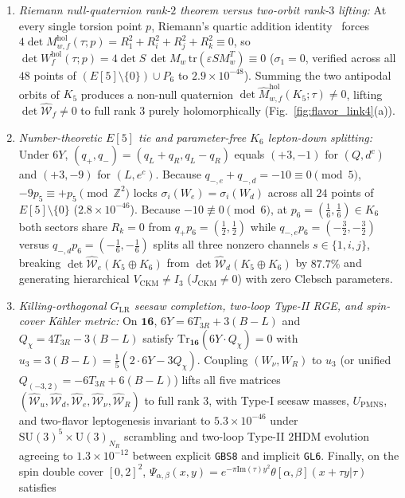 \documentclass[aps,prd,twocolumn,nofootinbib,floatfix]{revtex4-2}
\begin{document}
\begin{enumerate}
    \item \emph{Riemann null-quaternion rank-$2$ theorem versus two-orbit rank-$3$ lifting:} At every single torsion point $p$, Riemann's quartic addition identity~\cite{Riemann1857,Mumford1983} forces $4\det M_{w,f}^{\mathrm{hol}}(\tau;p) = R_1^2 + R_i^2 + R_j^2 + R_k^2 \equiv 0$, so $\det W_f^{\mathrm{hol}}(\tau;p) = 4\det S\,\det M_w\,\mathrm{tr}(\varepsilon S M_w^T) \equiv 0$ ($\sigma_1 = 0$, verified across all $48$ points of $(E[5]\setminus\{0\})\cup P_6$ to $2.9\times 10^{-48}$). Summing the two antipodal orbits of $K_5$ produces a non-null quaternion $\det\widehat{M}_{w,f}^{\mathrm{hol}}(K_5;\tau) \ne 0$, lifting $\det\widehat{\mathcal{W}}_f \ne 0$ to full rank $3$ purely holomorphically (Fig.~\ref{fig:flavor_link4}(a)).
    \item \emph{Number-theoretic $E[5]$ tie and parameter-free $K_6$ lepton-down splitting:} Under $6Y$, $(q_+, q_-) = (q_L+q_R, q_L-q_R)$ equals $(+3,-1)$ for $(Q,d^c)$ and $(+3,-9)$ for $(L,e^c)$. Because $q_{-,e} + q_{-,d} = -10 \equiv 0 \pmod 5$, $-9 p_5 \equiv +p_5 \pmod{\mathbb{Z}^2}$ locks $\sigma_i(W_e) = \sigma_i(W_d)$ across all $24$ points of $E[5]\setminus\{0\}$ ($2.8\times 10^{-46}$). Because $-10 \not\equiv 0 \pmod 6$, at $p_6 = (\frac{1}{6},\frac{1}{6}) \in K_6$ both sectors share $R_k = 0$ from $q_+ p_6 = (\frac{1}{2},\frac{1}{2})$ while $q_{-,e}p_6 = (-\frac{3}{2},-\frac{3}{2})$ versus $q_{-,d}p_6 = (-\frac{1}{6},-\frac{1}{6})$ splits all three nonzero channels $s \in \{1,i,j\}$, breaking $\det\widehat{\mathcal{W}}_e(K_5\oplus K_6)$ from $\det\widehat{\mathcal{W}}_d(K_5\oplus K_6)$ by $87.7\%$ and generating hierarchical $V_{\mathrm{CKM}} \ne I_3$ ($J_{\mathrm{CKM}} \ne 0$) with zero Clebsch parameters.
    \item \emph{Killing-orthogonal $G_{\mathrm{LR}}$ seesaw completion, two-loop Type-II RGE, and spin-cover K\"ahler metric:} On $\mathbf{16}$, $6Y = 6T_{3R}+3(B-L)$ and $Q_\chi = 4T_{3R}-3(B-L)$ satisfy $\mathrm{Tr}_{\mathbf{16}}(6Y\cdot Q_\chi) = 0$ with $u_3 = 3(B-L) = \frac{1}{5}(2\cdot 6Y - 3Q_\chi)$. Coupling $(W_\nu, W_R)$ to $u_3$ (or unified $Q_{(-3,2)} = -6T_{3R}+6(B-L)$) lifts all five matrices $(\widehat{\mathcal{W}}_u, \widehat{\mathcal{W}}_d, \widehat{\mathcal{W}}_e, \widehat{\mathcal{W}}_\nu, \widehat{\mathcal{W}}_R)$ to full rank $3$, with Type-I seesaw masses, $U_{\mathrm{PMNS}}$, and two-flavor leptogenesis invariant to $5.3\times 10^{-46}$ under $\mathrm{SU}(3)^5\times\mathrm{U}(3)_{N_R}$ scrambling and two-loop Type-II $2\mathrm{HDM}$ evolution~\cite{MachacekVaughn1983,MachacekVaughn1984} agreeing to $1.3\times 10^{-12}$ between explicit \texttt{GBS8} and implicit \texttt{GL6}. Finally, on the spin double cover $[0,2]^2$, $\Psi_{\alpha,\beta}(x,y) = e^{-\pi\mathrm{Im}(\tau)y^2}\theta[\alpha,\beta](x+\tau y|\tau)$ satisfies

\end{enumerate}
\end{document}
